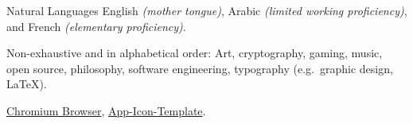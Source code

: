 \documentclass[10pt,a4paper]{article}
\begin{document}
\inlineheadsection 
{Natural Languages}
{English \textit{(mother tongue)}, Arabic \textit{(limited working proficiency)}, and French \textit{(elementary proficiency)}.}


\spacedhrule{1.6em}{-0.4em} %



\inlineheadsection %
{Non-exhaustive and in alphabetical order:}
{Art, cryptography, gaming, music, open source, philosophy, software engineering, typography (e.g.\ graphic design, \LaTeX).}


\spacedhrule{1.6em}{-0.4em} %



{\href{http://www.chromium.org}{Chromium Browser}, \href{https://github.com/theherk/App-Icon-Template}{App-Icon-Template}.}

\end{document}
